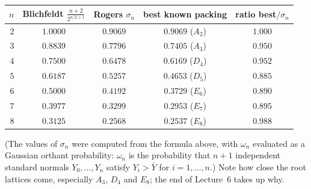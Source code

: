 \begin{center}
\renewcommand{\arraystretch}{1.15}
\begin{tabular}{rcccc}
\toprule
$n$ & Blichfeldt $\frac{n+2}{2^{n/2+1}}$ & Rogers $\sigma_n$ & best known packing & ratio best$/\sigma_n$\\
\midrule
$2$ & $1.0000$ & $0.9069$ & $0.9069$ ($A_2$) & $1.000$\\
$3$ & $0.8839$ & $0.7796$ & $0.7405$ ($A_3$) & $0.950$\\
$4$ & $0.7500$ & $0.6478$ & $0.6169$ ($D_4$) & $0.952$\\
$5$ & $0.6187$ & $0.5257$ & $0.4653$ ($D_5$) & $0.885$\\
$6$ & $0.5000$ & $0.4192$ & $0.3729$ ($E_6$) & $0.890$\\
$7$ & $0.3977$ & $0.3299$ & $0.2953$ ($E_7$) & $0.895$\\
$8$ & $0.3125$ & $0.2568$ & $0.2537$ ($E_8$) & $0.988$\\
\bottomrule
\end{tabular}
\end{center}
(The values of $\sigma_n$ were computed from the formula above, with $\omega_n$ evaluated as a Gaussian
orthant probability: $\omega_n$ is the probability that $n+1$ independent standard normals $Y_0,\dots,Y_n$
satisfy $Y_i>\bar Y$ for $i=1,\dots,n$.) Note how close the root lattices come, especially $A_3$, $D_4$ and $E_8$; the end
of Lecture~6 takes up why.


